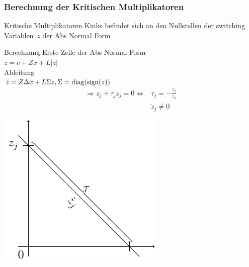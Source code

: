 \begin{frame}[<+->]
\frametitle{Berechnung der Kritischen Multiplikatoren}
\begin{minipage}{0.5\textwidth} 
	\begin{block}{Kritische Multiplikatoren}
	 \glqq Kinks befindet sich an den Nullstellen der switching Variablen~$z$ der Abs Normal Form \grqq
	\end{block}
	\begin{block}{Berechnung}
	   Erste Zeile der Abs Normal Form\\
	   $ z = c+ Zx+L|z|$\\
	    Ableitung\\
	   $\dot z = Z\Delta x+L\Sigma z, \Sigma = \operatorname{diag}(\operatorname{sign}(z))$
	    \begin{align*}
	    \Rightarrow z_j + \tau_j \dot z_j = 0 \iff & \tau_j = -\frac{z_j}{\dot z_j}\\
						       & \dot z_j\neq 0
	    \end{align*}
	\end{block}
	\end{minipage}
	\hfill
	\begin{minipage}{0.4\textwidth}
	\includegraphics[width=\linewidth]{../dipl_tex/img/tikz/finding_kinks.pdf}	
	\end{minipage}
\end{frame}
